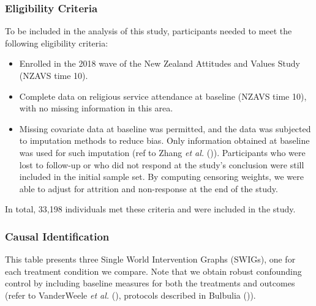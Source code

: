 \documentclass[
  single column]{article}
\providecommand{\tightlist}{%
  \setlength{\itemsep}{0pt}\setlength{\parskip}{0pt}}\usepackage{longtable,booktabs,array}
\begin{document}
\subsubsection{Eligibility Criteria}\label{eligibility-criteria}

To be included in the analysis of this study, participants needed to
meet the following eligibility criteria:

\begin{itemize}
\tightlist
\item
  Enrolled in the 2018 wave of the New Zealand Attitudes and Values
  Study (NZAVS time 10).
\item
  Complete data on religious service attendance at baseline (NZAVS time
  10), with no missing information in this area.
\item
  Missing covariate data at baseline was permitted, and the data was
  subjected to imputation methods to reduce bias. Only information
  obtained at baseline was used for such imputation (ref to Zhang
  \emph{et al.}
  ()).
  Participants who were lost to follow-up or who did not respond at the
  study's conclusion were still included in the initial sample set. By
  computing censoring weights, we were able to adjust for attrition and
  non-response at the end of the study.
\end{itemize}

In total, 33,198 individuals met these criteria and were included in the
study.

\subsubsection{Causal Identification}\label{causal-identification}

\begin{table}

\caption{\label{tbl-02}This table presents three Single World
Intervention Graphs (SWIGs), one for each treatment condition we
compare. Note that we obtain robust confounding control by including
baseline measures for both the treatments and outcomes (refer to
VanderWeele \emph{et al.} (),
protocols described in Bulbulia
()).}

\centering{

\lmtptablethree

}

\end{table}%
\end{document}

